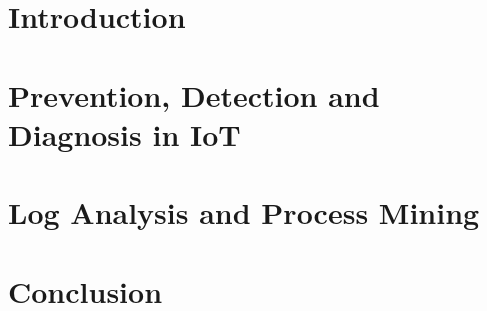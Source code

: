 \documentclass[a4paper,10pt,3p,twocolumn]{elsarticle}
\begin{document}
	
	
	
	
	\section{Introduction}
	
	
	\section{Prevention, Detection and Diagnosis in IoT}
	

	
	\section{Log Analysis and Process Mining}
	
	\label{section:ProblemStatement}

	
	\section{Conclusion}
	
	
	
	
	
\end{document}

